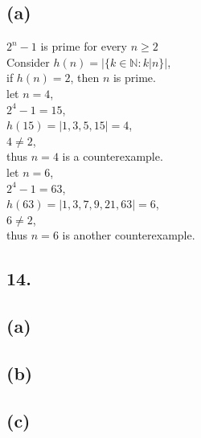 \documentclass[11pt]{article}
\begin{document}
\subsection*{(a)}
\begin{center}
$2^{n} - 1$ is prime for every $n \geq 2$\\
\hfill \break
Consider $h(n) = |\{k \in \mathbb{N} : k|n\}|$,\\
if $h(n) = 2$, then $n$ is prime.\\
let $n = 4$,\\
$2^{4} - 1 = 15$,\\
$h(15) = |1,3,5,15| = 4$,\\
$4 \neq 2$,\\
thus $n = 4$ is a counterexample.\\
let $n = 6$,\\
$2^{4} - 1 = 63$,\\
$h(63) = |1,3,7,9,21,63| = 6$,\\
$6 \neq 2$,\\
thus $n = 6$ is another counterexample.
\end{center}
%
%
\subsection*{14.}
\begin{center}

\end{center}

\subsection*{(a)}
\begin{center}

\hfill \break

\end{center}

\subsection*{(b)}
\begin{center}

\hfill \break

\end{center}

\subsection*{(c)}
\begin{center}

\hfill \break

\end{center}
\end{document}
